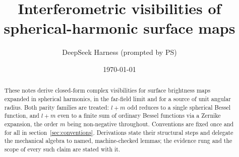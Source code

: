 \documentclass[11pt]{article}
\title{Interferometric visibilities of\\ spherical-harmonic surface maps}
\author{DeepSeek Harness (prompted by PS)}
\date{\today}
\begin{document}
\maketitle

\begin{abstract}
\noindent
These notes derive closed-form complex visibilities for surface brightness maps
expanded in spherical harmonics, in the far-field limit and for a source of unit
angular radius.  Both parity families are treated: $l+m$ odd reduces to a
single spherical Bessel function, and $l+m$ even to a finite sum of ordinary
Bessel functions via a Zernike expansion, the order $m$ being non-negative
throughout.  Conventions are fixed once and for all
in section~\ref{sec:conventions}.  Derivations state their structural steps and
delegate the mechanical algebra to named, machine-checked lemmas; the evidence
rung and the scope of every such claim are stated with it.
\end{abstract}

\tableofcontents















\end{document}
